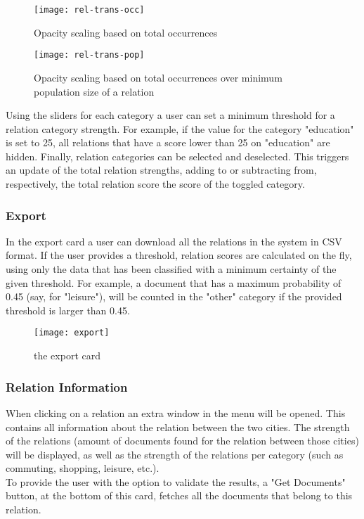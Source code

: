 \begin{figure}[H]
    \centering
    \begin{minipage}{0.9\textwidth}
        \centering
        \texttt{[image: rel-trans-occ]}
        \caption{Opacity scaling based on total occurrences}
        \label{fig:rel-trans-occ}
    \end{minipage}\hfill
    \begin{minipage}{0.9\textwidth}
        \centering
        \texttt{[image: rel-trans-pop]}
        \caption{Opacity scaling based on total occurrences over minimum population size of a relation}
        \label{fig:rel-trans-pop}
    \end{minipage}
    \label{fig:rel-trans}
\end{figure}

Using the sliders for each category a user can set a minimum threshold for a relation category strength. For example, if the value for the category "education" is set to 25, all relations that have a score lower than 25 on "education" are hidden.
Finally, relation categories can be selected and deselected. This triggers an update of the total relation strengths, adding to or subtracting from, respectively, the total relation score the score of the toggled category.


\subsubsection{Export}
In the export card a user can download all the relations in the system in CSV format. If the user provides a threshold, relation scores are calculated on the fly, using only the data that has been classified with a minimum certainty of the given threshold. For example, a document that has a maximum probability of 0.45 (say, for "leisure"), will be counted in the "other" category if the provided threshold is larger than 0.45.

\begin{figure}[H]
    \centering
    \texttt{[image: export]}
    \caption{the export card}
    \label{fig:infoflow}
\end{figure}

\subsubsection{Relation Information}\label{sec:rel-info}

When clicking on a relation an extra window in the menu will be opened. This contains all information about the relation between the two cities. The strength of the relations (amount of documents found for the relation between those cities) will be displayed, as well as the strength of the relations per category (such as commuting, shopping, leisure, etc.).\\
To provide the user with the option to validate the results, a "Get Documents" button, at the bottom of this card, fetches all the documents that belong to this relation.


